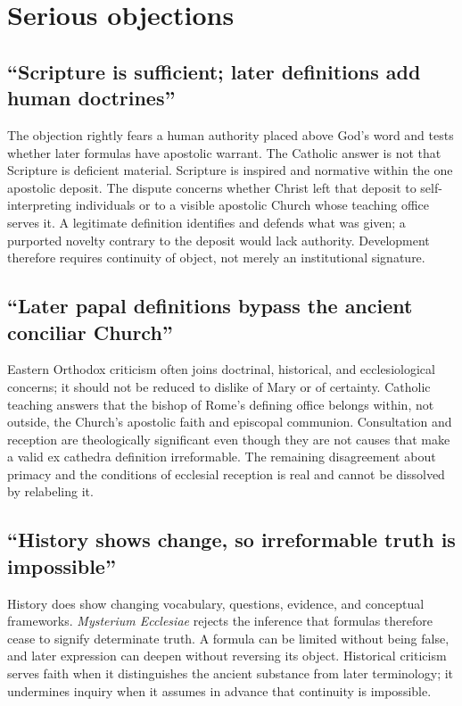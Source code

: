\section{Serious objections}

\subsection{``Scripture is sufficient; later definitions add human doctrines''}

The objection rightly fears a human authority placed above God's word and
tests whether later formulas have apostolic warrant. The Catholic answer is not
that Scripture is deficient material. Scripture is inspired and normative
within the one apostolic deposit. The dispute concerns whether Christ left that
deposit to self-interpreting individuals or to a visible apostolic Church
whose teaching office serves it. A legitimate definition identifies and
defends what was given; a purported novelty contrary to the deposit would lack
authority. Development therefore requires continuity of object, not merely an
institutional signature.

\subsection{``Later papal definitions bypass the ancient conciliar Church''}

Eastern Orthodox criticism often joins doctrinal, historical, and
ecclesiological concerns; it should not be reduced to dislike of Mary or of
certainty. Catholic teaching answers that the bishop of Rome's defining office
belongs within, not outside, the Church's apostolic faith and episcopal
communion. Consultation and reception are theologically significant even
though they are not causes that make a valid ex cathedra definition
irreformable. The remaining disagreement about primacy and the conditions of
ecclesial reception is real and cannot be dissolved by relabeling it.

\subsection{``History shows change, so irreformable truth is impossible''}

History does show changing vocabulary, questions, evidence, and conceptual
frameworks. \emph{Mysterium Ecclesiae} rejects the inference that formulas
therefore cease to signify determinate truth. A formula can be limited without
being false, and later expression can deepen without reversing its object.
Historical criticism serves faith when it distinguishes the ancient substance
from later terminology; it undermines inquiry when it assumes in advance that
continuity is impossible.

